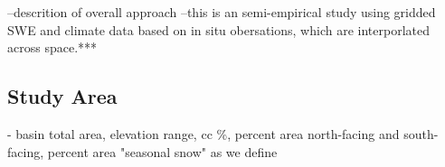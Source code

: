 --descrition of overall approach
--this is an semi-empirical study using gridded SWE and climate data based on in situ obersations, which are interporlated across space.***

\hypertarget{ch2-sa}{\subsection{Study Area}\label{ch2-sa}}



- basin total area, elevation range, cc \%, percent area north-facing and south-facing, percent area "seasonal snow" as we define

